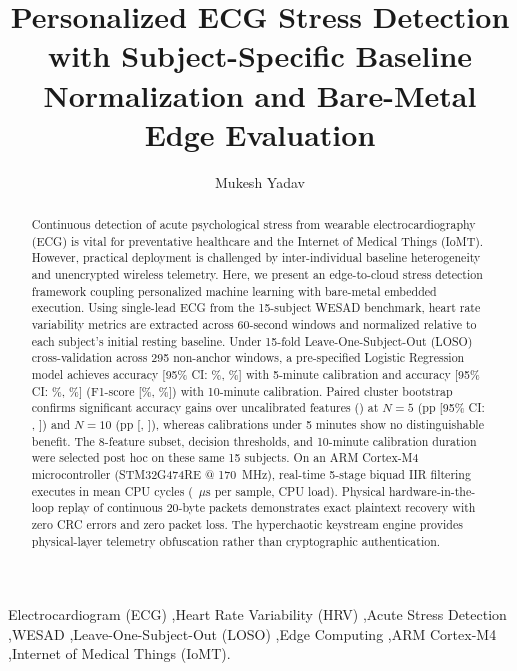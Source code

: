\documentclass[preprint,12pt,3p]{elsarticle}
\begin{document}
\begin{frontmatter}

\title{Personalized ECG Stress Detection with Subject-Specific Baseline Normalization and Bare-Metal Edge Evaluation}

\author[jss]{Mukesh Yadav}

\address[jss]{Department of Electronics and Communication Engineering (ECE), JSS Academy of Technical Education (JSSATEN), Noida, Uttar Pradesh, India}

\begin{abstract}
Continuous detection of acute psychological stress from wearable electrocardiography (ECG) is vital for preventative healthcare and the Internet of Medical Things (IoMT). However, practical deployment is challenged by inter-individual baseline heterogeneity and unencrypted wireless telemetry. Here, we present an edge-to-cloud stress detection framework coupling personalized machine learning with bare-metal embedded execution. Using single-lead ECG from the 15-subject WESAD benchmark, heart rate variability metrics are extracted across 60-second windows and normalized relative to each subject's initial resting baseline. Under 15-fold Leave-One-Subject-Out (LOSO) cross-validation across 295 non-anchor windows, a pre-specified Logistic Regression model achieves \valNfiveAccPct accuracy [95\% CI: \valNfiveAccCILow\%, \valNfiveAccCIHigh\%] with 5-minute calibration and \valNtenAccPct accuracy [95\% CI: \valNtenAccCILow\%, \valNtenAccCIHigh\%] (\valNtenFOnePct F1-score [\valNtenFOneCILow\%, \valNtenFOneCIHigh\%]) with 10-minute calibration. Paired cluster bootstrap confirms significant accuracy gains over uncalibrated features (\valControlNoCalibAccPct) at $N=5$ (\valPairedGainNfive pp [95\% CI: \valPairedGainNfiveCILow, \valPairedGainNfiveCIHigh]) and $N=10$ (\valPairedGainNten pp [\valPairedGainNtenCILow, \valPairedGainNtenCIHigh]), whereas calibrations under 5 minutes show no distinguishable benefit. The 8-feature subset, decision thresholds, and 10-minute calibration duration were selected post hoc on these same 15 subjects. On an ARM Cortex-M4 microcontroller (STM32G474RE @ 170~MHz), real-time 5-stage biquad IIR filtering executes in \valBiquadMeanCycles mean CPU cycles (\valBiquadMeanUs~$\mu\text{s}$ per sample, \valBiquadCpuLoad CPU load). Physical hardware-in-the-loop replay of \valHilPackets continuous 20-byte packets demonstrates exact plaintext recovery with zero CRC errors and zero packet loss. The hyperchaotic keystream engine provides physical-layer telemetry obfuscation rather than cryptographic authentication.
\end{abstract}

\begin{keyword}
Electrocardiogram (ECG) \sep Heart Rate Variability (HRV) \sep Acute Stress Detection \sep WESAD \sep Leave-One-Subject-Out (LOSO) \sep Edge Computing \sep ARM Cortex-M4 \sep Internet of Medical Things (IoMT).
\end{keyword}

\end{frontmatter}
\end{document}
